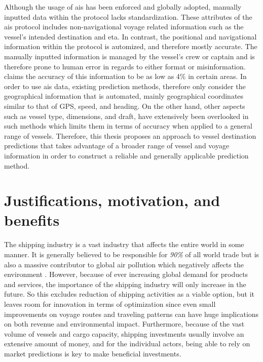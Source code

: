 Although the usage of \acrshort{ais} has been enforced and globally adopted, manually inputted data within the protocol lacks standardization. These attributes of the \acrshort{ais} protocol includes non-navigational voyage related information such as the vessel's intended destination and \acrfull{eta}. In contrast, the positional and navigational information within the protocol is automized, and therefore mostly accurate. The manually inputted information is managed by the vessel's crew or captain and is therefore prone to human error in regards to either format or misinformation. \cite{mestl2016} claims the accuracy of this information to be as low as 4\% in certain areas. In order to use \acrshort{ais} data, existing prediction methods, therefore only consider the geographical information that is automated, mainly geographical coordinates similar to that of GPS\@, speed, and heading. On the other hand, other aspects such as vessel type, dimensions, and draft, have extensively been overlooked in such methods which limits them in terms of accuracy when applied to a general range of vessels. Therefore, this thesis proposes an approach to vessel destination predictions that takes advantage of a broader range of vessel and voyage information in order to construct a reliable and generally applicable prediction method.

\section{Justifications, motivation, and benefits}
\label{section:justifications_motivations_benefits}

The shipping industry is a vast industry that affects the entire world in some manner. It is generally believed to be responsible for \textit{90\%} of all world trade \parencite{grote2016} but is also a massive contributor to global air pollution which negatively affects the environment \parencite{zheng2016:online}. However, because of ever increasing global demand for products and services, the importance of the shipping industry will only increase in the future. So this excludes reduction of shipping activities as a viable option, but it leaves room for innovation in terms of optimization since even small improvements on voyage routes and traveling patterns can have huge implications on both revenue and environmental impact. Furthermore, because of the vast volume of vessels and cargo capacity, shipping investments usually involve an extensive amount of money, and for the individual actors, being able to rely on market predictions is key to make beneficial investments. 

